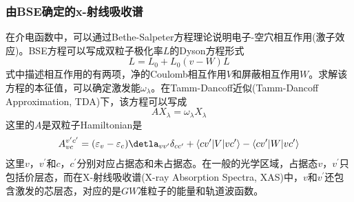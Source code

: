 \subsubsection{由\rm{BSE}确定的\rm{x}-射线吸收谱}
在介电函数中，可以通过\textrm{Bethe-Salpeter}方程理论说明电子-空穴相互作用(激子效应)。\textrm{BSE}方程可以写成双粒子极化率$L$的\textrm{Dyson}方程形式
\begin{displaymath}
	L=L_0+L_0(v-W)L
\end{displaymath}
式中描述相互作用的有两项，净的\textrm{Coulomb}相互作用$V$和屏蔽相互作用$W$。求解该方程的本征值，可以确定激发能$\omega_{\lambda}$。在\textrm{Tamm-Dancoff}近似\textrm{(Tamm-Dancoff Approximation, TDA)}下，该方程可以写成
\begin{displaymath}
	AX_{\lambda}=\omega_{\lambda}X_{\lambda}
\end{displaymath}
这里的$A$是双粒子\textrm{Hamiltonian}是
\begin{displaymath}
	A_{vc}^{v^{\prime}c^{\prime}}=(\varepsilon_v-\varepsilon_c)\detla_{vv^{\prime}}\delta_{cc^{\prime}}+\langle cv^{\prime}|V|vc^{\prime}\rangle-\langle cv^{\prime}|W|vc^{\prime}\rangle
\end{displaymath}
这里$v$，$v^{\prime}$和$c$，$c^{\prime}$分别对应占据态和未占据态。在一般的光学区域，占据态$v$，$v^{\prime}$只包括价层态，而在\textrm{X}-射线吸收谱\textrm{(X-ray Absorption Spectra, XAS)}中，$v$和$v^{\prime}$还包含激发的芯层态，对应的是$GW$准粒子的能量和轨道波函数。

